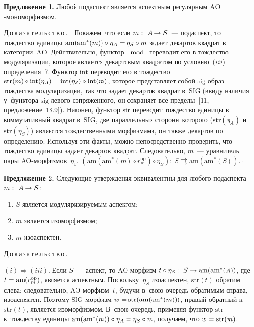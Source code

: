 \begin{multicols}{2}
 \noindent
 \textbf{Предложение 1.} Любой подаспект является аспектным регулярным
$\mathrm{AO}$-мо\-но\-мор\-физ\-мом.

 \smallskip

 \noindent
 Д\,о\,к\,а\,з\,а\,т\,е\,л\,ь\,с\,т\,в\,о\,.\ \ Покажем, что если $m:\ A \hm\to S$~---
подаспект, то тождество единицы $\mathrm{am}(\mathrm{am}^*(m)) \circ \eta_A \hm= \eta_{S} \circ
m$ задает декартов квад\-рат в категории~$\mathrm{AO}$. Действительно, функтор $\mod$
переводит его в тождество модуляризации, которое является декартовым
квадратом по условию~($iii$) определения~7. Функтор $\mathrm{int}$ переводит его в
тож\-де\-ст\-во $\mathrm{str}(m) \circ \mathrm{int}(\eta_A) \hm= \mathrm{int}(\eta_S) \circ \mathrm{int}(m)$, которое
представляет собой $\mathrm{sig}$-об\-раз тождества модуляризации, так что задает
декартов квадрат в~$\mathrm{SIG}$ (ввиду наличия у~функтора $\mathrm{sig}$ левого
сопряженного, он сохраняет все пределы~[11, предложение~18.9]). Наконец,
функтор $\mathrm{str}$ переводит тождество единицы в коммутативный квадрат в~$\mathrm{SIG}$,
две параллельных стороны которого ($\mathrm{str}(\eta_A)$ и~$\mathrm{str}(\eta_S)$) являются
тождественными морфизмами, он также декартов по определению. Используя
эти факты, можно непосредственно проверить, что тождество единицы задает
декартов квадрат. Следовательно, $m$~--- уравнитель пары
 $\mathrm{AO}$-мор\-физ\-мов~$\eta_S$, $(\mathrm{am}(\mathrm{am}^*(m) \circ r_m^{\mathrm{op}}) \circ \eta_S):\ S
\rightrightarrows \mathrm{am}(\mathrm{am}^*(S))$.\hfill$\square$

 \smallskip

 \noindent
 \textbf{Предложение 2.} Следующие утверждения эквивалентны для любого
подаспекта $m:\ A \hm\to S$:
 \begin{enumerate}[($i$)]
\item $S$ является модуляризируемым аспектом;
 \item $m$ является изоморфизмом;
\item $m$ изоаспектен.
\end{enumerate}

\noindent
 Д\,о\,к\,а\,з\,а\,т\,е\,л\,ь\,с\,т\,в\,о\,.\ \

$(i) \Rightarrow (iii)$. Если $S$~--- аспект, то $\mathrm{AO}$-мор\-физм
$t \circ \eta_S:\ S \hm\to \mathrm{am}(\mathrm{am}^*(A))$, где
$t \hm= \mathrm{am}(r_m^{\mathrm{op}})$, является аспектным.
Поскольку~$\eta_S$ изоаспектен, $\mathrm{str}(t)$ обратим слева; следовательно,
$\mathrm{AO}$-мор\-физм~$t$, будучи в~свою очередь обратимым справа,
изоаспектен. Поэтому $\mathrm{SIG}$-мор\-физм $w \hm= \mathrm{str}(\mathrm{am}(\mathrm{am}^*(m)))$,
правый обратный к~$\mathrm{str}(t)$, является изоморфизмом. В~свою очередь,
применяя функтор $\mathrm{str}$ к~тождеству единицы
$\mathrm{am}(\mathrm{am}^*(m)) \circ \eta_A \hm= \eta_S \circ m$,
получаем, что $w \hm= \mathrm{str}(m)$.


\end{multicols}
